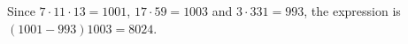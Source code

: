 Since $7\cdot11\cdot13=1001$, $17\cdot59=1003$ and $3\cdot331=993$, the expression is $(1001-993)1003=\boxed{8024}$.
